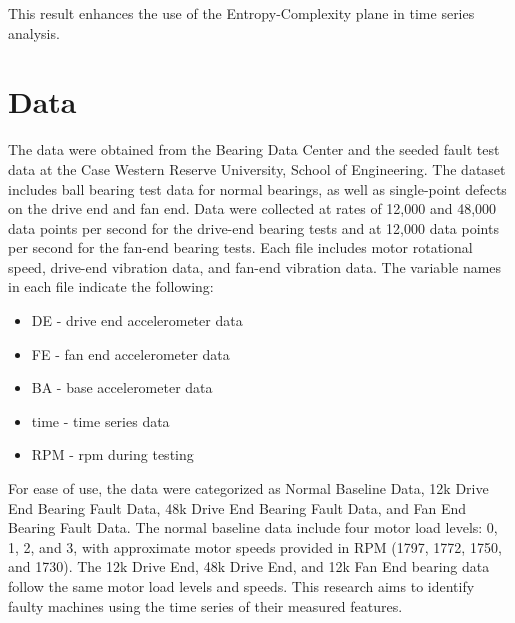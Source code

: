 \documentclass[a0,portrait]{a0poster}
\begin{document}
\begin{mdframed}[style=MyFrame]
\begin{multicols}{2}
This result enhances the use of the Entropy-Complexity plane in time series analysis.

\section{Data}\label{section1}

The data were obtained from the Bearing Data Center and the seeded fault test data at the Case Western Reserve University, School of Engineering. 
The dataset includes ball bearing test data for normal bearings, as well as single-point defects on the drive end and fan end. 
Data were collected at rates of 12,000 and 48,000 data points per second for the drive-end bearing tests and at 12,000 data points per second for the fan-end
bearing tests. Each file includes motor rotational speed, drive-end vibration data, and fan-end vibration data. The variable names in each file
indicate the following:
\begin{itemize}
        \item DE - drive end accelerometer data
        \item FE - fan end accelerometer data
	\item BA - base accelerometer data
	\item time - time series data
	\item RPM - rpm during testing
\end{itemize}
	
For ease of use, the data were categorized as Normal Baseline Data, 12k Drive End Bearing Fault Data, 48k Drive End Bearing Fault Data, and Fan
End Bearing Fault Data. The normal baseline data include four motor load levels: 0, 1, 2, and 3, with approximate motor speeds provided in RPM
(1797, 1772, 1750, and 1730). The 12k Drive End, 48k Drive End, and 12k Fan End bearing data follow the same motor load levels and speeds. This
research aims to identify faulty machines using the time series of their measured features.



\end{multicols}
\end{mdframed}
\end{document}
